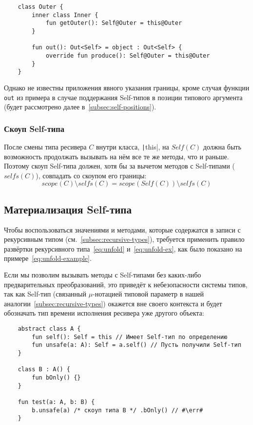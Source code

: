 \begin{verbatim}
    class Outer {
        inner class Inner {
            fun getOuter(): Self@Outer = this@Outer
        }

        fun out(): Out<Self> = object : Out<Self> {
            override fun produce(): Self@Outer = this@Outer
        }
    }
\end{verbatim}

Однако не известны приложения явного указания границы, кроме случая функции \texttt{out} из примера в случае поддержания Self-типов в позиции типового аргумента (будет рассмотрено далее в~\ref{subsec:self-positions}).

\subsubsection{Скоуп Self-типа}

После смены типа ресивера $C$ внутри класса, \texttt|this|, на $Self(C)$ должна быть возможность продолжать вызывать на нём все те же методы, что и раньше.
Поэтому скоуп Self-типа должен, хотя бы за вычетом методов с Self-типами ($selfs(C)$), совпадать со скоупом его границы:
\begin{equation*}
    scope(C) \setminus selfs(C) = scope(Self(C)) \setminus selfs(C)
\end{equation*}


\subsection{Материализация Self-типа} \label{subsec:materialization}

Чтобы воспользоваться значениями и методами, которые содержатся в записи с рекурсивным типом (см.~\ref{subsec:recursive-types}), требуется применить правило развёртки рекурсивного типа~\eqref{eq:unfold} и~\eqref{eq:unfold-ex}, как было показано на примере~\eqref{eq:unfold-example}.

Если мы позволим вызывать методы с Self-типами без каких-либо предварительных преобразований, это приведёт к небезопасности системы типов, так как Self-тип (связанный $\mu$-нотацией типовой параметр в нашей аналогии~\ref{subsec:recursive-types}) окажется вне своего контекста и будет обозначать тип времени исполнения ресивера уже другого объекта:

\begin{verbatim}
    abstract class A {
        fun self(): Self = this // Имеет Self-тип по определению
        fun unsafe(a: A): Self = a.self() // Пусть получили Self-тип
    }

    class B : A() {
        fun bOnly() {}
    }

    fun test(a: A, b: B) {
        b.unsafe(a) /* скоуп типа B */ .bOnly() // #\err#
    }
\end{verbatim}

